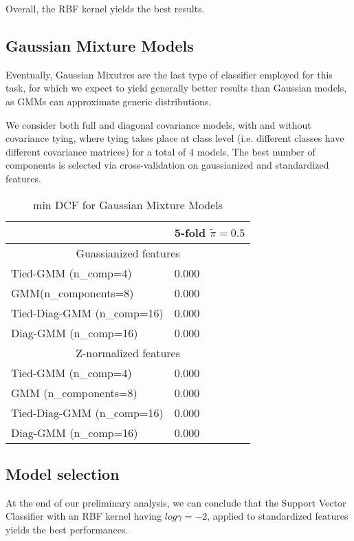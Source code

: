 Overall, the RBF kernel yields the best results.

\subsection{Gaussian Mixture Models}
Eventually, Gaussian Mixutres are the last type of classifier employed for this task, for which we expect to yield generally better results than Gaussian models, as GMMs can approximate generic distributions.

We consider both full and diagonal covariance models, with and without covariance tying, where tying takes place at class level (i.e. different classes have different covariance matrices) for a total of 4 models. The best number of components is selected via cross-validation on gaussianized and standardized features.

\noindent
\begin{table}[H]
	\begin{tabular}{ p{5cm} p{1.5cm} }
		\hline
		\hline
		&  \makecell{\textbf{5-fold} \\ $\tilde{\pi} = 0.5$} \\
		\hline
		\multicolumn{2}{c}{Guassianized features} \\
		\hline
		Tied-GMM (n\_comp=4)  & 0.000 \\
		GMM(n\_components=8) 	& 0.000 \\	
		Tied-Diag-GMM (n\_comp=16) & 	\boxit{red}{.35in}0.000 \\
		Diag-GMM (n\_comp=16) & 0.000 \\
		\hline
		\multicolumn{2}{c}{Z-normalized features} \\
		\hline
		Tied-GMM (n\_comp=4)  & 0.000 \\
		GMM (n\_components=8) 	& 0.000 \\	
		Tied-Diag-GMM (n\_comp=16) & 0.000 \\
		Diag-GMM (n\_comp=16) & 0.000 \\
		\hline
	\end{tabular}
	\caption{min DCF for Gaussian Mixture Models}
	\label{tab:gmm_res}
\end{table}



\subsection{Model selection}
At the end of our preliminary analysis, we can conclude that the Support Vector Classifier with an RBF kernel having $log\gamma = -2$, applied to standardized features yields the best performances. 

